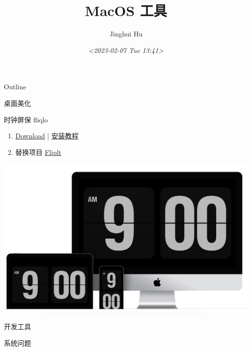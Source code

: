 \documentclass[presentation]{beamer}
\author{Jinghui Hu}
\date{\textit{<2023-02-07 Tue 13:41>}}
\title{MacOS 工具}
\begin{document}
\maketitle
\begin{frame}{Outline}
\tableofcontents
\end{frame}


\begin{frame}[label={sec:org69b32f3}]{桌面美化}
\begin{block}{时钟屏保 fliqlo}
\begin{enumerate}
\item \href{https://fliqlo.com/screensaver/}{Download} | \href{https://www.xiaohongshu.com/explore/62f22988000000001200fdab}{安装教程}
\item 替换项目 \href{https://github.com/phaselden/FlipIt}{Fliplt}
\end{enumerate}

\begin{center}
\includegraphics[width=.9\linewidth]{../static/image/2023/0207/134403.png}
\end{center}
\end{block}
\end{frame}

\begin{frame}[label={sec:org0a6d636}]{开发工具}
\end{frame}

\begin{frame}[label={sec:org336bd6e}]{系统问题}
\end{frame}
\end{document}
